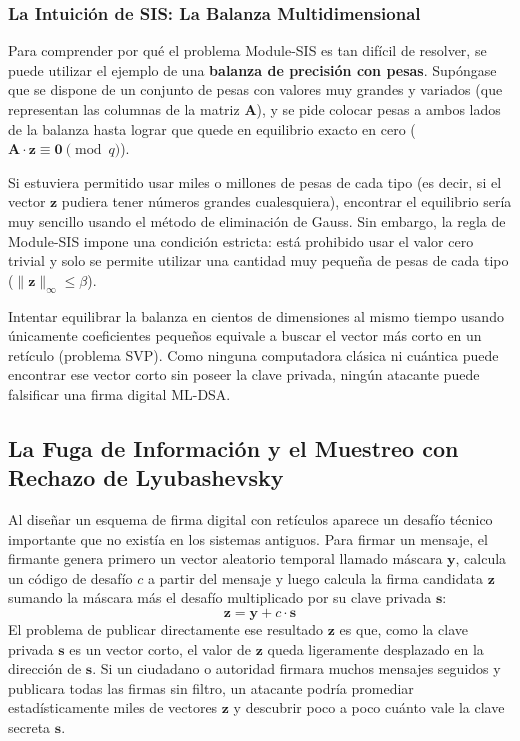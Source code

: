 \subsubsection{La Intuición de SIS: La Balanza Multidimensional}

Para comprender por qué el problema Module-SIS es tan difícil de resolver, se puede utilizar el ejemplo de una \textbf{balanza de precisión con pesas}. Supóngase que se dispone de un conjunto de pesas con valores muy grandes y variados (que representan las columnas de la matriz $\mathbf{A}$), y se pide colocar pesas a ambos lados de la balanza hasta lograr que quede en equilibrio exacto en cero ($\mathbf{A} \cdot \mathbf{z} \equiv \mathbf{0} \pmod q$).

Si estuviera permitido usar miles o millones de pesas de cada tipo (es decir, si el vector $\mathbf{z}$ pudiera tener números grandes cualesquiera), encontrar el equilibrio sería muy sencillo usando el método de eliminación de Gauss. Sin embargo, la regla de Module-SIS impone una condición estricta: está prohibido usar el valor cero trivial y solo se permite utilizar una cantidad muy pequeña de pesas de cada tipo ($\|\mathbf{z}\|_\infty \le \beta$).

Intentar equilibrar la balanza en cientos de dimensiones al mismo tiempo usando únicamente coeficientes pequeños equivale a buscar el vector más corto en un retículo (problema SVP). Como ninguna computadora clásica ni cuántica puede encontrar ese vector corto sin poseer la clave privada, ningún atacante puede falsificar una firma digital ML-DSA.

\subsection{La Fuga de Información y el Muestreo con Rechazo de Lyubashevsky}

Al diseñar un esquema de firma digital con retículos aparece un desafío técnico importante que no existía en los sistemas antiguos. Para firmar un mensaje, el firmante genera primero un vector aleatorio temporal llamado máscara $\mathbf{y}$, calcula un código de desafío $c$ a partir del mensaje y luego calcula la firma candidata $\mathbf{z}$ sumando la máscara más el desafío multiplicado por su clave privada $\mathbf{s}$:
\begin{equation}
	\mathbf{z} = \mathbf{y} + c \cdot \mathbf{s}
\end{equation}
El problema de publicar directamente ese resultado $\mathbf{z}$ es que, como la clave privada $\mathbf{s}$ es un vector corto, el valor de $\mathbf{z}$ queda ligeramente desplazado en la dirección de $\mathbf{s}$. Si un ciudadano o autoridad firmara muchos mensajes seguidos y publicara todas las firmas sin filtro, un atacante podría promediar estadísticamente miles de vectores $\mathbf{z}$ y descubrir poco a poco cuánto vale la clave secreta $\mathbf{s}$.

